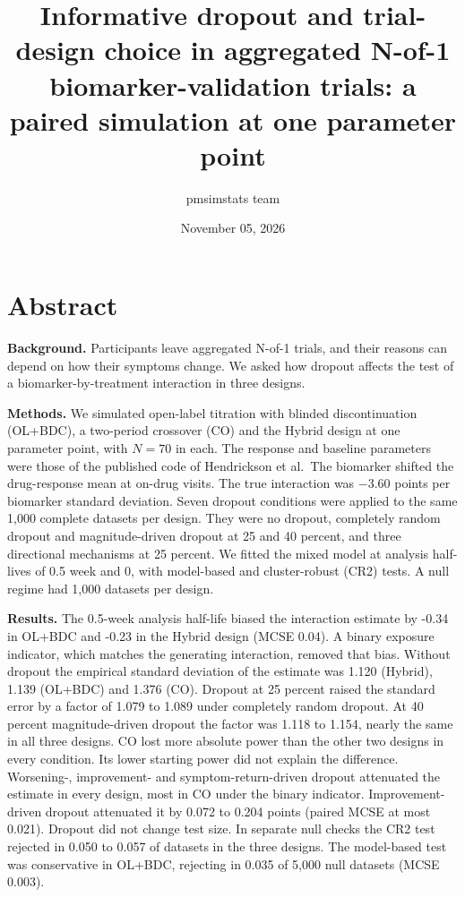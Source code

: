 \documentclass[
  11pt,
]{article}
\title{Informative dropout and trial-design choice in aggregated N-of-1 biomarker-validation trials: a paired simulation at one parameter point}
\author{pmsimstats team}
\date{November 05, 2026}
\begin{document}
\maketitle

{
\setcounter{tocdepth}{2}
\tableofcontents
}
\section*{Abstract}\label{abstract}

\textbf{Background.} Participants leave aggregated N-of-1 trials, and
their reasons can depend on how their symptoms change. We asked how
dropout affects the test of a biomarker-by-treatment interaction in
three designs.

\textbf{Methods.} We simulated open-label titration with blinded
discontinuation (OL+BDC), a two-period crossover (CO) and the Hybrid
design at one parameter point, with \(N = 70\) in each.
The response and baseline parameters were those of the published code
of Hendrickson et al.~The biomarker shifted the drug-response mean at
on-drug visits. The true interaction was \(-3.60\) points per
biomarker standard deviation. Seven dropout conditions were applied to
the same 1,000 complete datasets per design.
They were no dropout, completely random dropout and magnitude-driven
dropout at 25 and 40 percent, and three directional mechanisms at 25
percent. We fitted the mixed
model at analysis half-lives of 0.5 week and 0, with model-based and
cluster-robust (CR2) tests. A null regime had
1,000 datasets per design.

\textbf{Results.} The 0.5-week analysis half-life biased the
interaction estimate by -0.34 in OL+BDC
and -0.23 in the Hybrid design (MCSE
0.04). A binary exposure indicator,
which matches the generating interaction, removed that bias. Without
dropout the empirical standard deviation of the estimate was
1.120 (Hybrid), 1.139 (OL+BDC) and 1.376 (CO).
Dropout at 25 percent raised the standard error by a factor of
1.079 to 1.089 under completely random dropout.
At 40 percent magnitude-driven dropout the factor was 1.118
to 1.154, nearly the same in all three designs. CO lost
more absolute power than the other two designs in every condition.
Its lower starting power did not explain the difference. Worsening-,
improvement- and symptom-return-driven dropout attenuated the estimate
in every design, most in CO under the binary indicator.
Improvement-driven dropout attenuated it
by 0.072 to 0.204 points
(paired MCSE at most 0.021). Dropout did not
change test size. In separate null checks the CR2 test rejected in
0.050 to 0.057 of datasets
in the three designs. The model-based test was conservative in
OL+BDC, rejecting in 0.035 of
5,000 null datasets (MCSE
0.003).
\end{document}
